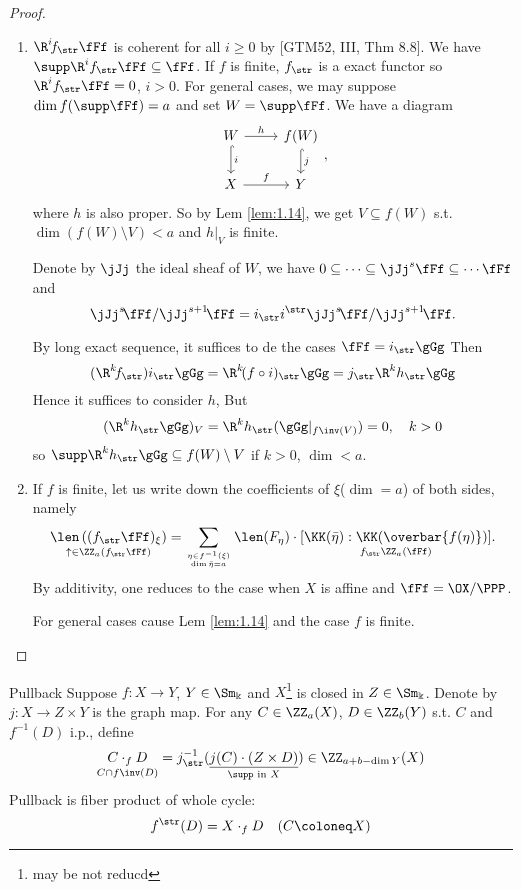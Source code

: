 \begin{proof}
	\begin{enumerate}
		\item
				$\R^i\!f_{\str}\fFf$ is coherent for all $i \geqslant 0$ by [GTM52, III, Thm 8.8].
				We have $\supp \R^if_{\str}\fFf\subseteq \fFf$. If $f$ is finite, $f_{\str}$ is a exact functor so $\R^i f_{\str}\fFf =0$, $i>0$. For general cases, we may suppose $\dim f(\supp\fFf)=a$ and set $W=\supp\fFf$. We have a diagram
				\[
						\begin{tikzcd}
							W\ar[d, "i", hook]\ar[r, "h"] & f(W)\ar[d, "j", hook] \\
							X\ar[r, "f"] & Y
						\end{tikzcd}
						,
				\]
				where $h$ is also proper. So by Lem \ref{lem:1.14}, we get $V \subseteq f(W)$ s.t. $\dim
				(f(W) \setminus V)<a$ and $h|_{V}$ is finite.

				Denote by $\jJj$ the ideal sheaf of $W$, we have $0\subseteq \cdots \subseteq \jJj^s \fFf
				\subseteq \cdots \fFf$ and
				$$\jJj^s\!\fFf/\jJj^{s+1}\!\fFf=i_{\str}i^{\str}\jJj^s\!\fFf/\jJj^{s+1}\!\fFf.$$

				By long exact sequence, it suffices to de the cases $\fFf=i_{\str}\gGg$ Then
				\[
						(\R^k\!f_{\str})i_{\str}\gGg = \R^k\!(f\circ i)_{\str}\gGg=j_{\str}\R^kh_{\str}\gGg
				\]
				Hence it suffices to consider $h$, But
				\[
						(\R^kh_{\str}\gGg)_V=\R^kh_{\str}(\gGg|_{f\inv(V)})=0,\quad k>0
				\]
				so $\supp \R^kh_{\str}\gGg\subseteq f(W)\setminus V$ if $k>0$, $\dim < a$.
		\item
				If $f$
				is finite, let us write down the coefficients of $\xi$($\dim = a $) of both sides, namely
				$$ \underset{\uparrow \in \ZZ_a(f_{\str}\fFf)}{\len\left((f_{\str}\fFf)_{\xi}\right)}=
				\sum_{\eta \in f^{-1}(\xi)\atop \dim\bar{\eta}=a}\len(F_\eta) \cdot
				\underset{f_{\str}\ZZ_a(\fFf)}{[\KK(\bar{\eta}): \KK(\overbar{f(\eta)})]}. $$ By
				additivity, one reduces to the case when $X$ is affine and $\fFf=\OX / \PPP$.

				For general cases cause Lem \ref{lem:1.14} and the case $f$ is finite.

				\qedhere
	\end{enumerate}
\end{proof}

\begin{definition}{Pullback}{}
	Suppose $f\colon X \rightarrow Y$, $Y \in \Sm_{\Bbbk}$ and $X$\footnote{may be not reducd} is closed  in $Z \in \Sm_{\Bbbk}$. Denote by $j\colon X \rightarrow Z \times Y$ is the graph map. For any $C \in \ZZ_a(X)$, $D \in \ZZ_b(Y)$ s.t. $C$ and $f^{-1}(D)$ i.p., define
	$$
	\underset{C\cap f\inv(D)}{C\cdot_f D}=j_{\str}^{-1}\underset{\supp\text{ in } X}{(\underline{j(C) \cdot(Z \times D)})} \in \ZZ_{a+b-\dim Y}(X)
	$$
	Pullback is fiber product of whole cycle:
	$$
	f^{\str}(D)=X\cdot_f D \quad(C\coloneq X)
	$$
\end{definition}

